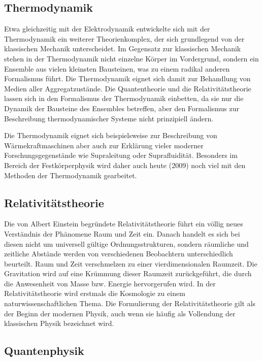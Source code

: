 \documentclass[titlepage, parkskip=full, twocolumn, landscape]{scrartcl}
\begin{document}
\subsection{Thermodynamik}

Etwa gleichzeitig mit der Elektrodynamik entwickelte sich mit der Thermodynamik ein weiterer Theorienkomplex, der sich grundlegend von der klassischen Mechanik unterscheidet. Im Gegensatz zur klassischen Mechanik stehen in der Thermodynamik nicht einzelne Körper im Vordergrund, sondern ein Ensemble aus vielen kleinsten Bausteinen, was zu einem radikal anderen Formalismus führt. Die Thermodynamik eignet sich damit zur Behandlung von Medien aller Aggregatzustände. Die Quantentheorie und die Relativitätstheorie lassen sich in den Formalismus der Thermodynamik einbetten, da sie nur die Dynamik der Bausteine des Ensembles betreffen, aber den Formalismus zur Beschreibung thermodynamischer Systeme nicht prinzipiell ändern.

Die Thermodynamik eignet sich beispielsweise zur Beschreibung von Wärmekraftmaschinen aber auch zur Erklärung vieler moderner Forschungsgegenstände wie Supraleitung oder Suprafluidität. Besonders im Bereich der Festkörperphysik wird daher auch heute (2009) noch viel mit den Methoden der Thermodynamik gearbeitet.

\subsection{Relativitätstheorie}

Die von Albert Einstein begründete Relativitätstheorie führt ein völlig neues Verständnis der Phänomene Raum und Zeit ein. Danach handelt es sich bei diesen nicht um universell gültige Ordnungsstrukturen, sondern räumliche und zeitliche Abstände werden von verschiedenen Beobachtern unterschiedlich beurteilt. Raum und Zeit verschmelzen zu einer vierdimensionalen Raumzeit. Die Gravitation wird auf eine Krümmung dieser Raumzeit zurückgeführt, die durch die Anwesenheit von Masse bzw. Energie hervorgerufen wird. In der Relativitätstheorie wird erstmals die Kosmologie zu einem naturwissenschaftlichen Thema. Die Formulierung der Relativitätstheorie gilt als der Beginn der modernen Physik, auch wenn sie häufig als Vollendung der klassischen Physik bezeichnet wird.

\subsection{Quantenphysik}
\end{document}
